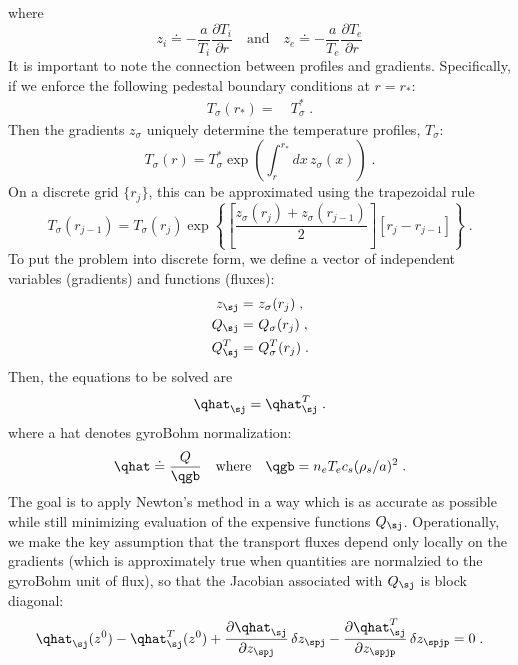 %
where
%
\begin{equation}
z_i \doteq - \frac{a}{T_i} \frac{\partial T_i}{\partial r} 
\quad\mbox{and}\quad 
z_e \doteq - \frac{a}{T_e} \frac{\partial T_e}{\partial r}
\end{equation}
%
It is important to note the connection between profiles and 
gradients.  Specifically, if we enforce the following pedestal 
boundary conditions at $r=r_*$:
%
\begin{align}
T_\sigma(r_*) = &~T_\sigma^* \; .
\end{align}
%
Then the gradients $z_\sigma$ uniquely determine the 
temperature profiles, $T_\sigma$:
%
\begin{equation}
T_\sigma(r) = T_\sigma^* 
 \exp\left( \int_r^{r_*} dx \, z_\sigma(x) \right) \; .
\end{equation}
%
On a discrete grid $\{r_j\}$, this can be approximated 
using the trapezoidal rule 
%
\begin{equation}
T_\sigma(r_{j-1}) = T_\sigma(r_j) \exp \left\{
 \left[ \frac{z_\sigma(r_j)+z_\sigma(r_{j-1})}{2} \right]
 \left[ r_j-r_{j-1} \right] \right\} \; .
\end{equation}
%
To put the problem into discrete form, we define a vector of 
independent variables (gradients) and functions (fluxes):
%
\begin{align}
z_\sj = &~ z_\sigma(r_j) \; , \\
Q_\sj = &~ Q_\sigma(r_j) \; , \\
Q^T_\sj = &~ Q^T_\sigma(r_j) \; .
\end{align}
%
Then, the equations to be solved are
%
\begin{equation}
\qhat_\sj = \qhat^T_\sj  \; .
\end{equation}
%
where a hat denotes gyroBohm normalization:
%
\begin{equation}
\qhat \doteq \frac{Q}{\qgb} 
\quad \text{where} \quad \qgb = n_e T_e c_s (\rho_s/a)^2 \; .
\end{equation}
%
The goal is to apply Newton's method in a way which is as accurate 
as possible while still minimizing evaluation of the expensive functions 
$Q_\sj$.  Operationally, we make the key assumption that the transport 
fluxes depend only locally on the gradients (which is approximately 
true when quantities are normalzied to the gyroBohm unit of flux), 
so that the Jacobian associated with $Q_\sj$ is block diagonal:
%
\begin{equation}
\qhat_\sj(z^0) - \qhat^T_\sj(z^0) 
 + \frac{\partial \qhat_\sj}{\partial z_\spj} \,\delta z_\spj 
 - \frac{\partial \qhat^T_\sj}{\partial z_\spjp} \, \delta z_\spjp
 = 0 \; .
\end{equation}
